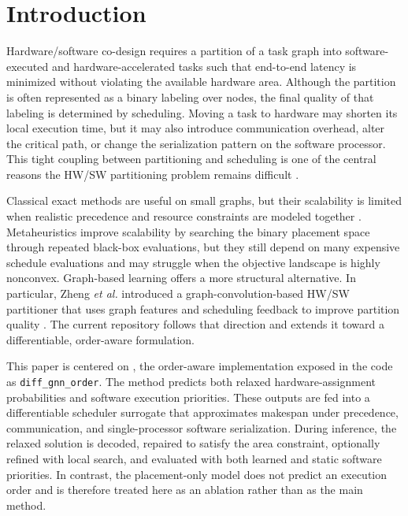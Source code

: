 \section{Introduction}
Hardware/software co-design requires a partition of a task graph into software-executed and hardware-accelerated tasks such that end-to-end latency is minimized without violating the available hardware area. Although the partition is often represented as a binary labeling over nodes, the final quality of that labeling is determined by scheduling. Moving a task to hardware may shorten its local execution time, but it may also introduce communication overhead, alter the critical path, or change the serialization pattern on the software processor. This tight coupling between partitioning and scheduling is one of the central reasons the HW/SW partitioning problem remains difficult \cite{arato2005algorithmic,hou2019survey,teich2012hardware}.

Classical exact methods are useful on small graphs, but their scalability is limited when realistic precedence and resource constraints are modeled together \cite{arato2005algorithmic,hou2019survey}. Metaheuristics improve scalability by searching the binary placement space through repeated black-box evaluations, but they still depend on many expensive schedule evaluations and may struggle when the objective landscape is highly nonconvex. Graph-based learning offers a more structural alternative. In particular, Zheng \textit{et al.} introduced a graph-convolution-based HW/SW partitioner that uses graph features and scheduling feedback to improve partition quality \cite{zheng2021hardware}. The current repository follows that direction and extends it toward a differentiable, order-aware formulation.

This paper is centered on \diffgnnorder, the order-aware implementation exposed in the code as \texttt{diff\_gnn\_order}. The method predicts both relaxed hardware-assignment probabilities and software execution priorities. These outputs are fed into a differentiable scheduler surrogate that approximates makespan under precedence, communication, and single-processor software serialization. During inference, the relaxed solution is decoded, repaired to satisfy the area constraint, optionally refined with local search, and evaluated with both learned and static software priorities. In contrast, the placement-only \diffgnn model does not predict an execution order and is therefore treated here as an ablation rather than as the main method.

